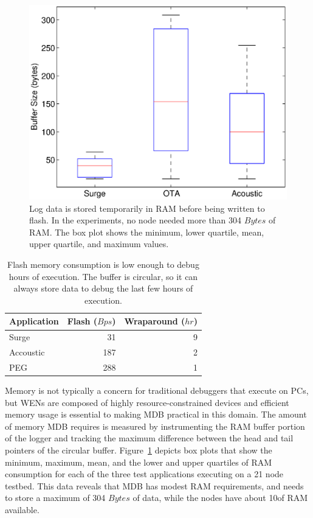 \begin{figure}[!htb]
  \centering
  \includegraphics[width=0.6\columnwidth]{fig/bufferSize}
  \caption[RAM Overhead]{Log data is stored temporarily in RAM before being written to flash.
    In the experiments, no node needed more than 304 $Bytes$ of RAM\@. The box plot
    shows the minimum, lower quartile, mean, upper quartile, and maximum
    values.}
  \label{fig:bufferSize}
\end{figure}

\begin{table}
  \centering
  {
    \begin{tabular}{|l|r|r|} \hline
      Application & Flash ($Bps$) & Wraparound ($hr$)\\ \hline\hline
      Surge & 31 & 9 \\ \hline
      Accoustic & 187 & 2 \\ \hline
      PEG & 288 & 1 \\ \hline
  \end{tabular}}
  \caption[Flash memory consumption]{Flash memory consumption is low enough to debug hours of
      execution. The buffer is circular, so it can always store data to debug the
      last few hours of execution.}
  \label{table:flashCapacity}
\end{table}

Memory is not typically a concern for traditional debuggers that execute on PCs,
but WENs are composed of highly resource-constrained devices and efficient
memory usage is essential to making MDB practical in this domain. The amount of
memory MDB requires is measured by instrumenting the RAM buffer portion of the
logger and tracking the maximum difference between the head and tail pointers of
the circular buffer. Figure~\ref{fig:bufferSize} depicts box plots that show the
minimum, maximum, mean, and the lower and upper quartiles of RAM consumption for
each of the three test applications executing on a 21 node testbed. This data
reveals that MDB has modest RAM requirements, and needs to store a maximum of
304 $Bytes$ of data, while the \tmotesky nodes have about 10\KB of RAM
available.

